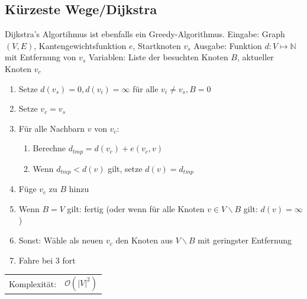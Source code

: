 \documentclass[12pt,a4paper]{article}
\begin{document}
\subsection{Kürzeste Wege/Dijkstra}
Dijkstra's Algortihmus ist ebenfalls ein Greedy-Algorithmus. \newline
Eingabe: Graph $(V, E)$, Kantengewichtsfunktion $e$, Startknoten $v_s$\newline
Ausgabe: Funktion $d : V \longmapsto \mathbb{N} $ mit Entfernung von $v_s$\newline
Variablen: Liste der besuchten Knoten $B$, aktueller Knoten $v_c$
\begin{enumerate}
	\item Setze $d(v_s) = 0, d(v_i) = \infty$ für alle $v_i \neq v_s, B = 0$
	\item Setze $v_c = v_s$
	\item Für alle Nachbarn $v$ von $v_c$:
	\begin{enumerate}
		\item Berechne $d_{tmp} = d(v_c) + e(v_c, v)$
		\item Wenn $d_{tmp} < d(v)$ gilt, setze $d(v) = d_{tmp}$
	\end{enumerate}
	\item Füge $v_c$ zu $B$ hinzu
	\item Wenn $B = V$ gilt: fertig (oder wenn für alle Knoten $v \in V \backslash B$ gilt: $d(v) = \infty$)
	\item Sonst: Wähle als neuen $v_c$ den Knoten aus $V \backslash B$ mit geringster Entfernung
	\item Fahre bei 3 fort
\end{enumerate}
\begin{tabularx}{\textwidth}{l l}
	Komplexität: &$\mathcal{O}(|V|^2)$\\
\end{tabularx}
\end{document}

